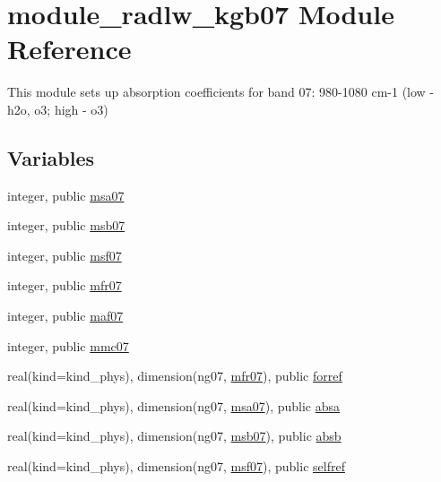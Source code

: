 \hypertarget{namespacemodule__radlw__kgb07}{}\section{module\+\_\+radlw\+\_\+kgb07 Module Reference}
\label{namespacemodule__radlw__kgb07}


This module sets up absorption coefficients for band 07\+: 980-\/1080 cm-\/1 (low -\/ h2o, o3; high -\/ o3)  


\subsection*{Variables}
\begin{DoxyCompactItemize}
\item 
integer, public \hyperlink{namespacemodule__radlw__kgb07_a0acb84a6b261fc00f1765707844c32f2}{msa07}
\item 
integer, public \hyperlink{namespacemodule__radlw__kgb07_abba2139dfc5d8551f844f3809c28ce3c}{msb07}
\item 
integer, public \hyperlink{namespacemodule__radlw__kgb07_a9310f33501467fbadcf092d71559358b}{msf07}
\item 
integer, public \hyperlink{namespacemodule__radlw__kgb07_a0bd5d550553238ae13cbf57423d102c8}{mfr07}
\item 
integer, public \hyperlink{namespacemodule__radlw__kgb07_a21ac454fe21fb07ee555b4106121b2ae}{maf07}
\item 
integer, public \hyperlink{namespacemodule__radlw__kgb07_a2d176bec938d9fdcc2369fda91308702}{mmc07}
\item 
real(kind=kind\+\_\+phys), dimension(ng07, \hyperlink{namespacemodule__radlw__kgb07_a0bd5d550553238ae13cbf57423d102c8}{mfr07}), public \hyperlink{namespacemodule__radlw__kgb07_a43ceef4cb2707a2874c2d59e93ba9791}{forref}
\item 
real(kind=kind\+\_\+phys), dimension(ng07, \hyperlink{namespacemodule__radlw__kgb07_a0acb84a6b261fc00f1765707844c32f2}{msa07}), public \hyperlink{namespacemodule__radlw__kgb07_af106cf054f7496a092ceb0c399753a36}{absa}
\item 
real(kind=kind\+\_\+phys), dimension(ng07, \hyperlink{namespacemodule__radlw__kgb07_abba2139dfc5d8551f844f3809c28ce3c}{msb07}), public \hyperlink{namespacemodule__radlw__kgb07_ab0478438e9bbe64401aa492510f8d4bb}{absb}
\item 
real(kind=kind\+\_\+phys), dimension(ng07, \hyperlink{namespacemodule__radlw__kgb07_a9310f33501467fbadcf092d71559358b}{msf07}), public \hyperlink{namespacemodule__radlw__kgb07_aaf6d41f390a0465af92756b9c3e6c558}{selfref}

\end{DoxyCompactItemize}

